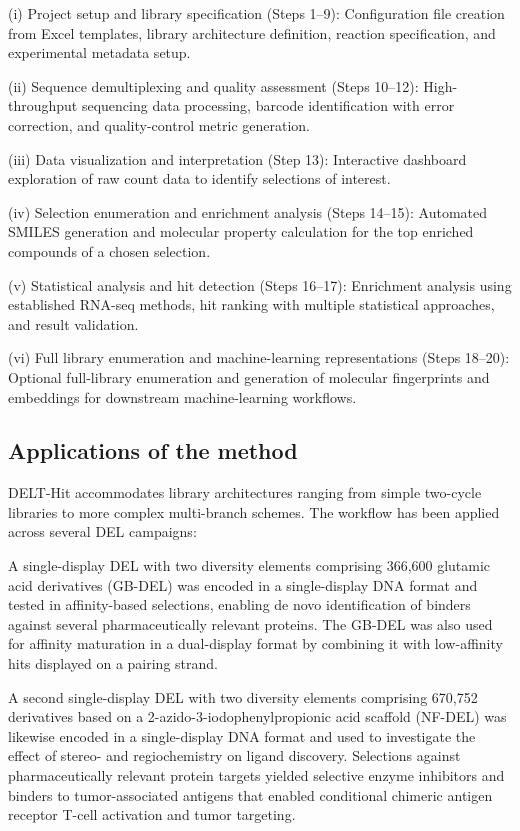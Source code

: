 (i) Project setup and library specification (Steps 1--9): Configuration file creation from Excel templates, library architecture definition, reaction specification, and experimental metadata setup.

(ii) Sequence demultiplexing and quality assessment (Steps 10--12): High-throughput sequencing data processing, barcode identification with error correction, and quality-control metric generation.

(iii) Data visualization and interpretation (Step 13): Interactive dashboard exploration of raw count data to identify selections of interest.

(iv) Selection enumeration and enrichment analysis (Steps 14--15): Automated SMILES generation and molecular property calculation for the top enriched compounds of a chosen selection.

(v) Statistical analysis and hit detection (Steps 16--17): Enrichment analysis using established RNA-seq methods, hit ranking with multiple statistical approaches, and result validation.

(vi) Full library enumeration and machine-learning representations (Steps 18--20): Optional full-library enumeration and generation of molecular fingerprints and embeddings for downstream machine-learning workflows.


\subsection{Applications of the method}
DELT-Hit accommodates library architectures ranging from simple two-cycle libraries to more complex multi-branch schemes. The workflow has been applied across several DEL campaigns:

A single-display DEL with two diversity elements comprising 366,600 glutamic acid derivatives (GB-DEL) was encoded in a single-display DNA format and tested in affinity-based selections, enabling de novo identification of binders against several pharmaceutically relevant proteins. The GB-DEL was also used for affinity maturation in a dual-display format by combining it with low-affinity hits displayed on a pairing strand\cite{bassi_singlestrandeddnaencodedchemical_2020}.

A second single-display DEL with two diversity elements comprising 670,752 derivatives based on a 2-azido-3-iodophenylpropionic acid scaffold (NF-DEL) was likewise encoded in a single-display DNA format and used to investigate the effect of stereo- and regiochemistry on ligand discovery. Selections against pharmaceutically relevant protein targets yielded selective enzyme inhibitors and binders to tumor-associated antigens that enabled conditional chimeric antigen receptor T-cell activation and tumor targeting\cite{favalli_stereoregiodefineddnaencoded_2021}.

